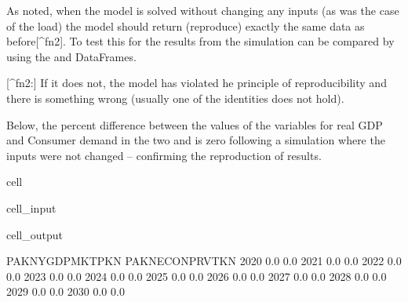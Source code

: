 \documentclass[letterpaper,10pt,english]{jupyterBook}
\begin{document}
\sphinxAtStartPar
As noted, when the model is solved without changing any inputs (as was the case of the load) the model should return (reproduce) exactly the same data as before{[}\textasciicircum{}fn2{]}.  To test this for  the results from the simulation can be compared by using the  and  DataFrames.

\sphinxAtStartPar
{[}\textasciicircum{}fn2:{]} If it does not, the model has violated he principle of reproducibility and there is something wrong (usually one of the identities does not hold).

\sphinxAtStartPar
Below, the percent difference between the values of the variables for real GDP and Consumer demand in the two   and  is zero following a simulation where the inputs were not changed – confirming the reproduction of results.

\begin{sphinxuseclass}{cell}\begin{sphinxVerbatimInput}

\begin{sphinxuseclass}{cell_input}
\begin{sphinxVerbatim}[commandchars=\\\{\}]
\PYG{p}{[}\PYG{p}{]}
\end{sphinxVerbatim}

\end{sphinxuseclass}\end{sphinxVerbatimInput}
\begin{sphinxVerbatimOutput}

\begin{sphinxuseclass}{cell_output}
\begin{sphinxVerbatim}[commandchars=\\\{\}]
      PAKNYGDPMKTPKN  PAKNECONPRVTKN
2020             0.0             0.0
2021             0.0             0.0
2022             0.0             0.0
2023             0.0             0.0
2024             0.0             0.0
2025             0.0             0.0
2026             0.0             0.0
2027             0.0             0.0
2028             0.0             0.0
2029             0.0             0.0
2030             0.0             0.0
\end{sphinxVerbatim}

\end{sphinxuseclass}\end{sphinxVerbatimOutput}

\end{sphinxuseclass}
\end{document}

